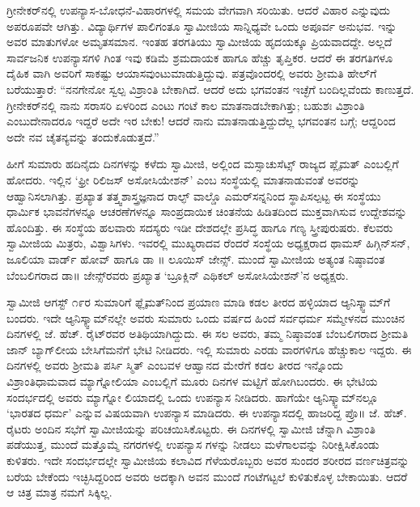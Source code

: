 ಗ್ರೀನೇಕರ್​ನಲ್ಲಿ ಉಪನ್ಯಾಸ-ಬೋಧನೆ-ವಿಹಾರಗಳಲ್ಲಿ ಸಮಯ ವೇಗವಾಗಿ ಸರಿಯಿತು. ಆದರೆ ವಿಹಾರ ಎನ್ನುವುದು ಅಪರೂಪವೇ ಆಗಿತ್ತು. ವಿದ್ಯಾರ್ಥಿಗಳ ಪಾಲಿಗಂತೂ ಸ್ವಾಮೀಜಿಯ ಸಾನ್ನಿಧ್ಯವೇ ಒಂದು ಅಪೂರ್ವ ಅನುಭವ. ಇನ್ನು ಅವರ ಮಾತುಗಳೋ ಅಮೃತಸಮಾನ. ಇಂತಹ ತರಗತಿಯು ಸ್ವಾಮೀಜಿಯ ಹೃದಯಕ್ಕೂ ಪ್ರಿಯವಾದದ್ದೇ. ಅಲ್ಲದೆ ಸಾರ್ವಜನಿಕ ಉಪನ್ಯಾಸಗಳಿ ಗಿಂತ ಇವು ಕಡಿಮೆ ಶ್ರಮದಾಯಕ ಹಾಗೂ ಹೆಚ್ಚು ತೃಪ್ತಿಕರ. ಆದರೆ ಈ ತರಗತಿಗಳೂ ದೈಹಿಕ ವಾಗಿ ಅವರಿಗೆ ಸಾಕಷ್ಟು ಆಯಾಸವುಂಟುಮಾಡುತ್ತಿದ್ದುವು. ಪತ್ರವೊಂದರಲ್ಲಿ ಅವರು ಶ್ರೀಮತಿ ಹೇಲ್​ಗೆ ಬರೆಯುತ್ತಾರೆ: “ನನಗೇನೋ ಸ್ವಲ್ಪ ವಿಶ್ರಾಂತಿ ಬೇಕಾಗಿದೆ. ಆದರೆ ಅದು ಭಗವಂತನ ಇಚ್ಛೆಗೆ ಬಂದಿಲ್ಲವೆಂದು ಕಾಣುತ್ತದೆ. ಗ್ರೀನೇಕರ್​ನಲ್ಲಿ ನಾನು ಸರಾಸರಿ ಏಳರಿಂದ ಎಂಟು ಗಂಟೆ ಕಾಲ ಮಾತನಾಡಬೇಕಾಗಿತ್ತು; ಬಹುಶಃ ವಿಶ್ರಾಂತಿ ಎಂಬುದೇನಾದರೂ ಇದ್ದರೆ ಅದೇ ಇರ ಬೇಕು! ಆದರೆ ನಾನು ಮಾತನಾಡುತ್ತಿದ್ದುದೆಲ್ಲ ಭಗವಂತನ ಬಗ್ಗೆ; ಆದ್ದರಿಂದ ಅದೇ ನವ ಚೈತನ್ಯವನ್ನು ತಂದುಕೊಡುತ್ತದೆ.”

ಹೀಗೆ ಸುಮಾರು ಹದಿನೈದು ದಿನಗಳನ್ನು ಕಳೆದು ಸ್ವಾಮೀಜಿ, ಅಲ್ಲಿಂದ ಮಸ್ಸಾಚುಸೆಟ್ಸ್ ರಾಜ್ಯದ ಪ್ಲೈಮತ್ ಎಂಬಲ್ಲಿಗೆ ಹೋದರು. ಇಲ್ಲಿನ ‘ಫ್ರೀ ರಿಲಿಜಸ್ ಅಸೋಸಿಯೇಶನ್​’ ಎಂಬ ಸಂಸ್ಥೆಯಲ್ಲಿ ಮಾತನಾಡುವಂತೆ ಅವರನ್ನು ಆಹ್ವಾನಿಸಲಾಗಿತ್ತು. ಪ್ರಖ್ಯಾತ ತತ್ತ್ವಶಾಸ್ತ್ರಜ್ಞನಾದ ರಾಲ್ಫ್ ವಾಲ್ಡೊ ಎಮರ್​ಸನ್ನನಿಂದ ಸ್ಥಾಪಿಸಲ್ಪಟ್ಟ ಈ ಸಂಸ್ಥೆಯು ಧಾರ್ಮಿಕ ಭಾವನೆಗಳನ್ನೂ ಆಚರಣೆಗಳನ್ನೂ ಸಾಂಪ್ರದಾಯಿಕ ಚಿಂತನೆಯ ಹಿಡಿತದಿಂದ ಮುಕ್ತವಾಗಿಸುವ ಉದ್ದೇಶವನ್ನು ಹೊಂದಿತ್ತು. ಈ ಸಂಸ್ಥೆಯ ಹಲವಾರು ಸದಸ್ಯರು ಇಡೀ ದೇಶದಲ್ಲೇ ಪ್ರಸಿದ್ಧ ಹಾಗೂ ಗಣ್ಯ ಸ್ತ್ರೀಪುರುಷರು. ಕೆಲವರು ಸ್ವಾಮೀಜಿಯ ಮಿತ್ರರು, ವಿಶ್ವಾಸಿಗಳು. ಇವರಲ್ಲಿ ಮುಖ್ಯರಾದವ ರೆಂದರೆ ಸಂಸ್ಥೆಯ ಅಧ್ಯಕ್ಷರಾದ ಥಾಮಸ್ ಹಿಗ್ಗಿನ್​ಸನ್, ಜೂಲಿಯಾ ವಾರ್ಡ್ ಹೋವ್ ಹಾಗೂ ಡಾ ॥ ಲೂಯಿಸ್ ಜೇನ್ಸ್. ಮುಂದೆ ಸ್ವಾಮೀಜಿಯ ಅತ್ಯಂತ ನಿಷ್ಠಾವಂತ ಬೆಂಬಲಿಗರಾದ ಡಾ॥ ಜೇನ್ಸ್​ರವರು ಪ್ರಖ್ಯಾತ ‘ಬ್ರೂಕ್ಲಿನ್ ಎಥಿಕಲ್ ಅಸೋಸಿಯೇಶನ್​’ನ ಅಧ್ಯಕ್ಷರು.

ಸ್ವಾಮೀಜಿ ಆಗಸ್ಟ್ ೧೯ರ ಸುಮಾರಿಗೆ ಫ್ಲೈಮತ್​ನಿಂದ ಪ್ರಯಾಣ ಮಾಡಿ ಕಡಲ ತೀರದ ಹಳ್ಳಿಯಾದ ಆ್ಯನಿಸ್ಕ್ವಾಮ್​ಗೆ ಬಂದರು. ಇದೇ ಆ್ಯನಿಸ್ಕ್ವಾಮ್​ನಲ್ಲೇ ಅವರು ಸುಮಾರು ಒಂದು ವರ್ಷದ ಹಿಂದೆ ಸರ್ವಧರ್ಮ ಸಮ್ಮೇಳನದ ಮುಂಚಿನ ದಿನಗಳಲ್ಲಿ ಜೆ. ಹೆಚ್. ರೈಟ್​ರವರ ಅತಿಥಿಯಾಗಿದ್ದುದು. ಈ ಸಲ ಅವರು, ತಮ್ಮ ನಿಷ್ಠಾವಂತ ಬೆಂಬಲಿಗರಾದ ಶ್ರೀಮತಿ ಜಾನ್ ಬ್ಯಾಗ್​ಲೀಯ ಬೇಸಿಗೆಮನೆಗೆ ಭೇಟಿ ನೀಡಿದರು. ಇಲ್ಲಿ ಸುಮಾರು ಎರಡು ವಾರಗಳಿಗೂ ಹೆಚ್ಚುಕಾಲ ಇದ್ದರು. ಈ ದಿನಗಳಲ್ಲಿ ಅವರು ಶ್ರೀಮತಿ ಪರ್ಸಿ ಸ್ಮಿತ್ ಎಂಬವಳ ಆಹ್ವಾನದ ಮೇರೆಗೆ ಕಡಲ ತೀರದ ಇನ್ನೊಂದು ವಿಶ್ರಾಂತಿಧಾಮವಾದ ಮ್ಯಾಗ್ನೋಲಿಯಾ ಎಂಬಲ್ಲಿಗೆ ಮೂರು ದಿನಗಳ ಮಟ್ಟಿಗೆ ಹೋಗಿಬಂದರು. ಈ ಭೇಟಿಯ ಸಂದರ್ಭದಲ್ಲಿ ಅವರು ಮ್ಯಾಗ್ನೋ ಲಿಯಾದಲ್ಲಿ ಒಂದು ಉಪನ್ಯಾಸ ನೀಡಿದರು. ಹಾಗೆಯೇ ಆ್ಯನಿಸ್ಕ್ವಾಮ್​ನಲ್ಲೂ ‘ಭಾರತದ ಧರ್ಮ’ ಎನ್ನುವ ವಿಷಯವಾಗಿ ಉಪನ್ಯಾಸ ಮಾಡಿದರು. ಈ ಉಪನ್ಯಾಸದಲ್ಲಿ ಹಾಜರಿದ್ದ ಪ್ರೊ॥ ಜೆ. ಹೆಚ್. ರೈಟರು ಅಂದಿನ ಸಭೆಗೆ ಸ್ವಾಮೀಜಿಯನ್ನು ಪರಿಚಯಿಸಿಕೊಟ್ಟರು. ಈ ದಿನಗಳಲ್ಲಿ ಸ್ವಾಮೀಜಿ ಚೆನ್ನಾಗಿ ವಿಶ್ರಾಂತಿ ಪಡೆಯುತ್ತ, ಮುಂದೆ ಮತ್ತೊಮ್ಮೆ ನಗರಗಳಲ್ಲಿ ಉಪನ್ಯಾಸ ಗಳನ್ನು ನೀಡಲು ಮಳೆಗಾಲವನ್ನು ನಿರೀಕ್ಷಿಸಿಕೊಂಡು ಕುಳಿತರು. ಇದೇ ಸಂದರ್ಭದಲ್ಲೇ ಸ್ವಾಮೀಜಿಯ ಕಲಾವಿದ ಗೆಳೆಯರೊಬ್ಬರು ಅವರ ಸುಂದರ ಶರೀರದ ವರ್ಣಚಿತ್ರವನ್ನು ಬರೆಯ ಬೇಕೆಂದು ಇಚ್ಛಿಸಿದ್ದರಿಂದ ಅವರು ಅದಕ್ಕಾಗಿ ಅವನ ಮುಂದೆ ಗಂಟೆಗಟ್ಟಲೆ ಕುಳಿತುಕೊಳ್ಳ ಬೇಕಾಯಿತು. ಆದರೆ ಆ ಚಿತ್ರ ಮಾತ್ರ ನಮಗೆ ಸಿಕ್ಕಿಲ್ಲ.

